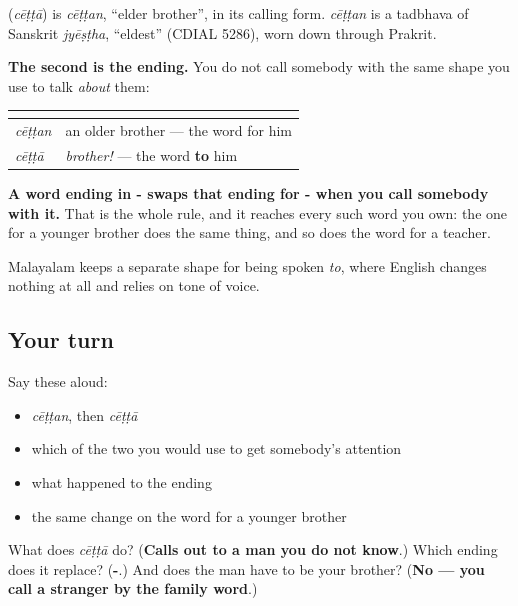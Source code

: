 \begin{cousinweb}
\textbf{} (\emph{cēṭṭā}) is \emph{cēṭṭan}, \textquotedblleft{}elder brother\textquotedblright{}, in its calling form. \emph{cēṭṭan} is a tadbhava of Sanskrit \emph{jyēṣṭha}, \textquotedblleft{}eldest\textquotedblright{} (CDIAL 5286), worn down through Prakrit.
\end{cousinweb}

\begin{grammarlens}[title={Grammar Lens: the calling form}]
\textbf{The second is the ending.} You do not call somebody with the same shape you use to talk \emph{about} them:

\noindent
\begin{tabularx}{\linewidth}{@{}>{\raggedright\arraybackslash}X>{\raggedright\arraybackslash}X@{}}
\toprule
\textbf{} & \textbf{} \\
\midrule
\textbf{\ml{ചേട്ടൻ}} \emph{cēṭṭan} & an older brother — the word for him \\
\textbf{\ml{ചേട്ടാ}} \emph{cēṭṭā} & \emph{brother!} — the word \textbf{to} him \\
\bottomrule
\end{tabularx}

\textbf{A word ending in - swaps that ending for - when you call somebody with it.} That is the whole rule, and it reaches every such word you own: the one for a younger brother does the same thing, and so does the word for a teacher.

Malayalam keeps a separate shape for being spoken \emph{to}, where English changes nothing at all and relies on tone of voice.
\end{grammarlens}

\subsection*{Your turn}
Say these aloud:

\begin{itemize}
\raggedright
  \item \emph{cēṭṭan}, then \emph{cēṭṭā}
  \item which of the two you would use to get somebody's attention
  \item what happened to the ending
  \item the same change on the word for a younger brother
\end{itemize}

\begin{tcolorbox}[breakable,colback=teal!4,colframe=teal!35!black,title={Before you move on}]
What does \emph{cēṭṭā} do? (\textbf{Calls out to a man you do not know}.) Which ending does it replace? (\textbf{-}.) And does the man have to be your brother? (\textbf{No — you call a stranger by the family word}.)
\end{tcolorbox}
